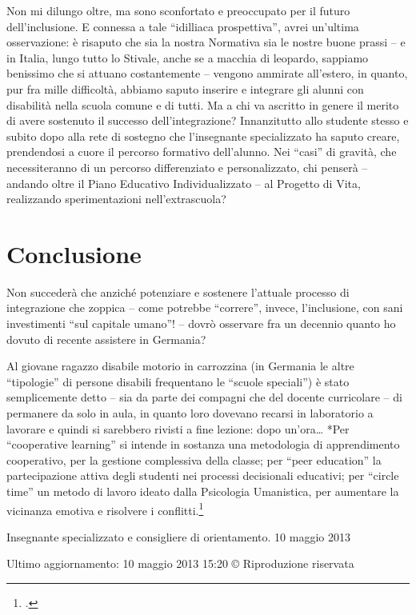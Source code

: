Non mi dilungo oltre, ma sono sconfortato e preoccupato per il futuro dell'inclusione. E connessa a tale “idilliaca prospettiva”, avrei un'ultima osservazione: è risaputo che sia la nostra Normativa sia le nostre buone prassi – e in Italia, lungo tutto lo Stivale, anche se a macchia di leopardo, sappiamo benissimo che si attuano costantemente – vengono ammirate all'estero, in quanto, pur fra mille difficoltà, abbiamo saputo inserire e integrare gli alunni con disabilità nella scuola comune e di tutti. Ma a chi va ascritto in genere il merito di avere sostenuto il successo dell'integrazione? Innanzitutto allo studente stesso e subito dopo alla rete di sostegno che l'insegnante specializzato ha saputo creare, prendendosi a cuore il percorso formativo dell'alunno. Nei “casi” di gravità, che necessiteranno di un percorso differenziato e personalizzato, chi penserà – andando oltre il Piano Educativo Individualizzato – al Progetto di Vita, realizzando sperimentazioni nell'extrascuola?
\section*{Conclusione}

Non succederà che anziché potenziare e sostenere l'attuale processo di integrazione che zoppica – come potrebbe “correre”, invece, l'inclusione, con sani investimenti “sul capitale umano”! – dovrò osservare fra un decennio quanto ho dovuto di recente assistere in Germania?

Al giovane ragazzo disabile motorio in carrozzina (in Germania le altre “tipologie” di persone disabili frequentano le “scuole speciali”) è stato semplicemente detto – sia da parte dei compagni che del docente curricolare – di permanere da solo in aula, in quanto loro dovevano recarsi in laboratorio a lavorare e quindi si sarebbero rivisti a fine lezione: dopo un'ora…
*Per “cooperative learning” si intende in sostanza una metodologia di apprendimento cooperativo, per la gestione complessiva della classe; per “peer education” la partecipazione attiva degli studenti nei processi decisionali educativi; per “circle time” un metodo di lavoro ideato dalla Psicologia Umanistica, per aumentare la vicinanza emotiva e risolvere i conflitti.\footcite{maffullo1}

Insegnante specializzato e consigliere di orientamento. 
10 maggio 2013

Ultimo aggiornamento: 10 maggio 2013 15:20
© Riproduzione riservata
 
